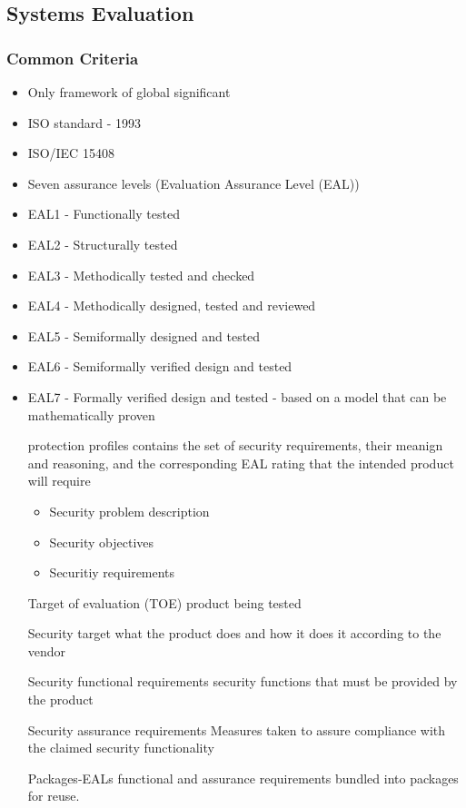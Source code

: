 \documentclass[11pt]{article}
\begin{document}
\subsection{Systems Evaluation}
\label{sec:org5929924}
\subsubsection{Common Criteria}
\label{sec:orgd503436}
\begin{itemize}
\item Only framework of global significant
\item ISO standard - 1993
\item ISO/IEC 15408
\item Seven assurance levels (Evaluation Assurance Level (EAL))
\item EAL1 - Functionally tested
\item EAL2 - Structurally tested
\item EAL3 - Methodically tested and checked
\item EAL4 - Methodically designed, tested and reviewed
\item EAL5 - Semiformally designed and tested
\item EAL6 - Semiformally verified design and tested
\item EAL7 - Formally verified design and tested - based on a model that can be mathematically proven
\item[{protection profiles}] contains the set of security requirements, their meanign and reasoning, and the corresponding EAL rating that the intended product will require
\begin{itemize}
\item Security problem description
\item Security objectives
\item Securitiy requirements
\end{itemize}
\item[{Target of evaluation (TOE)}] product being tested
\item[{Security target}] what the product does and how it does it according to the vendor
\item[{Security functional requirements}] security functions that must be provided by the product
\item[{Security assurance requirements}] Measures taken to assure compliance with the claimed security functionality
\item[{Packages-EALs}] functional and assurance requirements bundled into packages for reuse.
\end{itemize}
\end{document}
